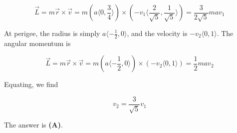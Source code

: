 \documentclass[12pt]{article}
\begin{document}
$$\vec{L} = m \vec{r} \times \vec{v} = m \left( a \langle 0, \frac{3}{4} \rangle \right) \times \left( -v_1 \langle \frac{2}{\sqrt{5}}, \frac{1}{\sqrt{5}} \rangle \right) = \frac{3}{2 \sqrt{5}} m a v_1$$

At perigee, the radius is simply $a \langle -\frac{1}{2}, 0 \rangle$, and the velocity is $-v_2 \langle 0, 1 \rangle$. The angular momentum is

$$\vec{L} = m \vec{r} \times \vec{v} = m \left( a \langle -\frac{1}{2}, 0 \rangle \right) \times \left( -v_2 \langle 0, 1 \rangle \right) = \frac{1}{2} m a v_2$$

Equating, we find

$$v_2 = \frac{3}{\sqrt{5}} v_1$$

The answer is \textbf{(A)}.
\end{document}
